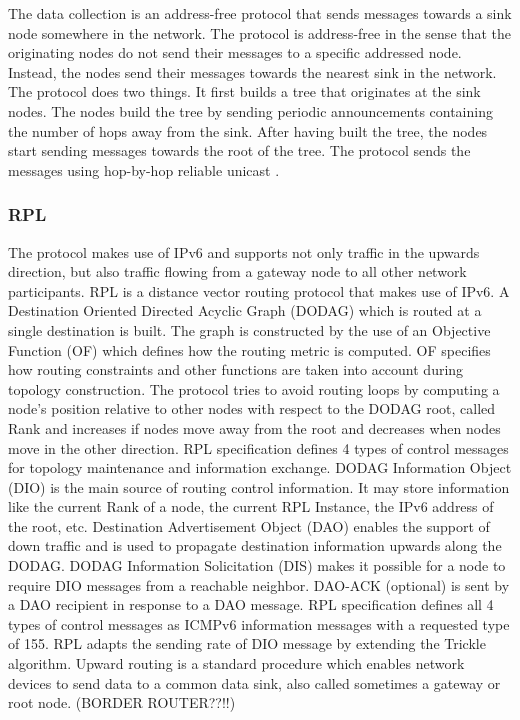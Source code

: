 The data collection is an address-free protocol that sends messages towards a sink node somewhere in the network. The protocol is address-free in the sense that the originating nodes do not send their messages to a specific addressed node. Instead, the nodes send their messages towards the nearest sink in the network. The protocol does two things. It first builds a tree that originates at the sink nodes. The nodes build the tree by sending periodic announcements containing the number of hops away from the sink. After having built the tree, the nodes start sending messages towards the root of the tree. The protocol sends the messages using hop-by-hop reliable unicast \cite{rime}. 

\subsubsection*{RPL}
The protocol makes use of IPv6 and supports not only traffic in the upwards direction, but also traffic flowing from a gateway node to all other network participants.
	RPL is a distance vector routing protocol that makes use of IPv6. A Destination Oriented Directed Acyclic Graph (DODAG) which is routed at a single destination is built. 
	The graph is constructed by the use of an Objective Function (OF) which defines how the routing metric is computed. OF specifies how routing constraints and other functions are taken into account during topology construction. The protocol tries to avoid routing loops by computing a node’s position relative to other nodes with respect to the DODAG root, called Rank and increases if nodes move away from the root and decreases when nodes move in the other direction. 
	RPL specification defines 4 types of control messages for topology maintenance and information exchange. DODAG Information Object (DIO) is the main source of routing control information. It may store information like the current Rank of a node, the current RPL Instance, the IPv6 address of the root, etc. Destination Advertisement Object (DAO) enables the support of down traffic and is used to propagate destination information upwards along the DODAG. DODAG Information Solicitation (DIS) makes it possible for a node to require DIO messages from a reachable neighbor. DAO-ACK (optional) is sent by a DAO recipient in response to a DAO message. RPL specification defines all 4 types of control messages as ICMPv6 information messages with a requested type of 155.
	RPL adapts the sending rate of DIO message by extending the Trickle algorithm.
	Upward routing is a standard procedure which enables network devices to send data to a common data sink, also called sometimes a gateway or root node. (BORDER ROUTER??!!)
